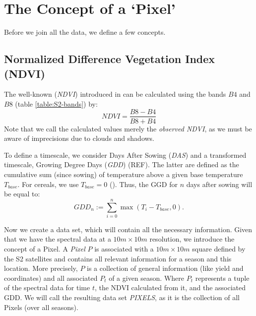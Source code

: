 \section{The Concept of a `Pixel'}{
		\label{sec:gather_data_to_pixel}
		Before we join all the data, we define a few concepts.

	\subsection{Normalized Difference Vegetation Index (NDVI)}{%
		The well-known  (\textit{NDVI}) introduced in \cite{rouseMonitoringVernalAdvancement1974} can be calculated using the bands $B4$ and $B8$ (table \ref{table:S2-bands}) by:
		\begin{equation}
			NDVI = \frac{B8 - B4}{B8 + B4}
			\label{eq:ndvi}
		\end{equation}
		Note that we call the calculated values merely the \textit{observed NDVI}, as we must be aware of imprecisions due to clouds and shadows. 
	}

		{%
			To define a timescale, we consider Days After Sowing (\textit{DAS}) and a transformed timescale, Growing Degree Days (\textit{GDD}) (\cite{mcmasterGrowingDegreedaysOne1997}REF). The latter are defined as the cumulative sum (since sowing) of temperature above a given base temperature $T_{base}$. For cereals, we use $T_{base}=0$ (\cite{perichPixelbasedYieldMapping2022a}). Thus, the GGD for $n$ days after sowing will be equal to:
			\begin{equation}
				\label{eq:gdd}
				GDD_n := \sum_{i=0}^n \max(T_i - T_{base}, 0).
			\end{equation}
		} 

		Now we create a data set, which will contain all the necessary information. Given that we have the spectral data at a $10m \times 10m$ resolution, we introduce the concept of a Pixel. A \textit{Pixel} $P$ is associated with a $10m \times 10m$ square defined by the S2 satellites and contains all relevant information for a season and this location. More precisely, $P$ is a collection of general information (like yield and coordinates) and all associated $P_t$ of a given season. Where $P_t$ represents a tuple of the spectral data for time $t$, the NDVI calculated from it, and the associated GDD. 
		We will call the resulting data set \textit{PIXELS}, as it is the collection of all Pixels (over all seasons). 
		
}
